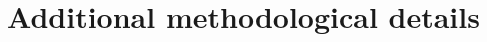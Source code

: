 \documentclass[11pt]{article}
\begin{document}
\FloatBarrier

\printbibliography

\appendix
\renewcommand{\thesection}{A\arabic{section}}
\renewcommand{\theequation}{A\arabic{equation}}
\renewcommand{\thetheorem}{A\arabic{theorem}}
\renewcommand{\theproposition}{A\arabic{proposition}}
\renewcommand{\thelemma}{A\arabic{lemma}}
\renewcommand{\thetable}{A\arabic{table}}
\renewcommand{\thefigure}{A\arabic{figure}}
\renewcommand{\thealgorithm}{A\arabic{algorithm}}
\setcounter{figure}{0}
\setcounter{table}{0}
\setcounter{proposition}{0}
\setcounter{theorem}{0}
\setcounter{lemma}{0}
\setcounter{algorithm}{0}


\section{Additional methodological details}  \label{appendix:method-details}

\end{document}
